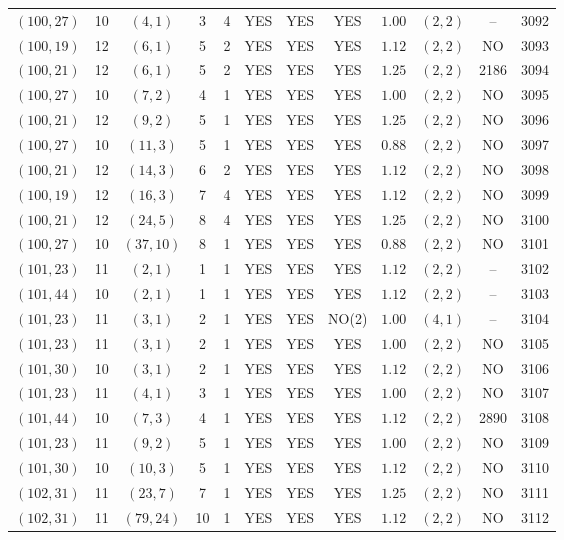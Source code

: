 \begin{longtable}{|c|c|c|c|c|c|c|c|c|c|c|c|}
$(100,27)$ & 10 & $(4,1)$ & 3 & 4 & YES & YES & YES & $1.00$ & $(2,2)$ & -- & 3092\\
$(100,19)$ & 12 & $(6,1)$ & 5 & 2 & YES & YES & YES & $1.12$ & $(2,2)$ & NO & 3093\\
$(100,21)$ & 12 & $(6,1)$ & 5 & 2 & YES & YES & YES & $1.25$ & $(2,2)$ & 2186 & 3094\\
$(100,27)$ & 10 & $(7,2)$ & 4 & 1 & YES & YES & YES & $1.00$ & $(2,2)$ & NO & 3095\\
$(100,21)$ & 12 & $(9,2)$ & 5 & 1 & YES & YES & YES & $1.25$ & $(2,2)$ & NO & 3096\\
$(100,27)$ & 10 & $(11,3)$ & 5 & 1 & YES & YES & YES & $0.88$ & $(2,2)$ & NO & 3097\\
$(100,21)$ & 12 & $(14,3)$ & 6 & 2 & YES & YES & YES & $1.12$ & $(2,2)$ & NO & 3098\\
$(100,19)$ & 12 & $(16,3)$ & 7 & 4 & YES & YES & YES & $1.12$ & $(2,2)$ & NO & 3099\\
$(100,21)$ & 12 & $(24,5)$ & 8 & 4 & YES & YES & YES & $1.25$ & $(2,2)$ & NO & 3100\\
$(100,27)$ & 10 & $(37,10)$ & 8 & 1 & YES & YES & YES & $0.88$ & $(2,2)$ & NO & 3101\\
$(101,23)$ & 11 & $(2,1)$ & 1 & 1 & YES & YES & YES & $1.12$ & $(2,2)$ & -- & 3102\\
$(101,44)$ & 10 & $(2,1)$ & 1 & 1 & YES & YES & YES & $1.12$ & $(2,2)$ & -- & 3103\\
$(101,23)$ & 11 & $(3,1)$ & 2 & 1 & YES & YES & NO(2) & $1.00$ & $(4,1)$ & -- & 3104\\
$(101,23)$ & 11 & $(3,1)$ & 2 & 1 & YES & YES & YES & $1.00$ & $(2,2)$ & NO & 3105\\
$(101,30)$ & 10 & $(3,1)$ & 2 & 1 & YES & YES & YES & $1.12$ & $(2,2)$ & NO & 3106\\
$(101,23)$ & 11 & $(4,1)$ & 3 & 1 & YES & YES & YES & $1.00$ & $(2,2)$ & NO & 3107\\
$(101,44)$ & 10 & $(7,3)$ & 4 & 1 & YES & YES & YES & $1.12$ & $(2,2)$ & 2890 & 3108\\
$(101,23)$ & 11 & $(9,2)$ & 5 & 1 & YES & YES & YES & $1.00$ & $(2,2)$ & NO & 3109\\
$(101,30)$ & 10 & $(10,3)$ & 5 & 1 & YES & YES & YES & $1.12$ & $(2,2)$ & NO & 3110\\
$(102,31)$ & 11 & $(23,7)$ & 7 & 1 & YES & YES & YES & $1.25$ & $(2,2)$ & NO & 3111\\
$(102,31)$ & 11 & $(79,24)$ & 10 & 1 & YES & YES & YES & $1.12$ & $(2,2)$ & NO & 3112\\

\end{longtable}
